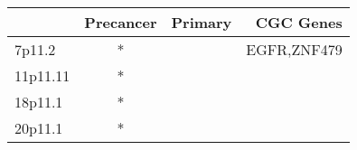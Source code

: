 \begin{tabular}{lccr}
\toprule
{} & Precancer & Primary &    CGC Genes \\
\midrule
7p11.2   &         * &         &  EGFR,ZNF479 \\
11p11.11 &         * &         &              \\
18p11.1  &         * &         &              \\
20p11.1  &         * &         &              \\
\bottomrule
\end{tabular}
